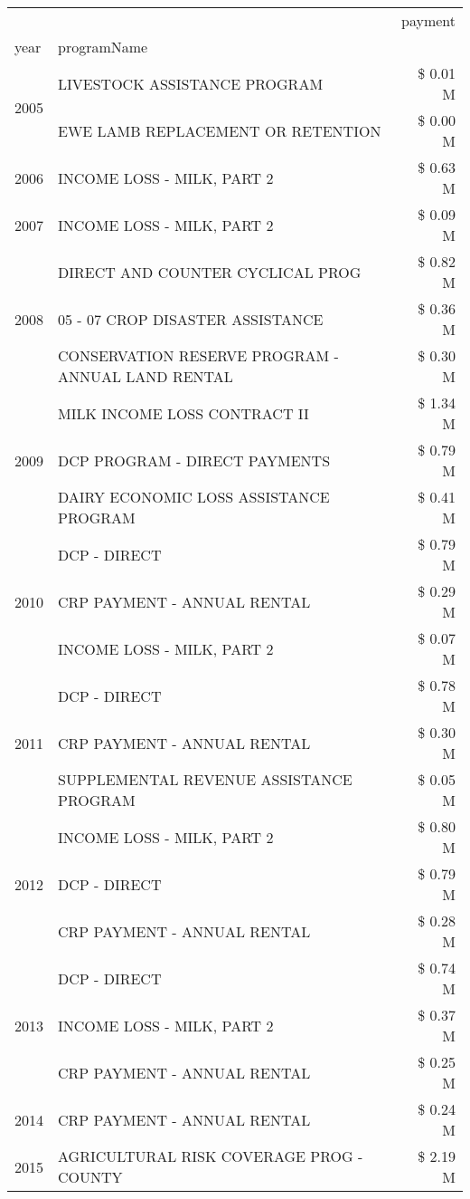\begin{tabular}{llr}
\toprule
 &  & payment \\
year & programName &  \\
\midrule
\multirow[t]{2}{*}{2005} & LIVESTOCK ASSISTANCE PROGRAM & \$ 0.01 M \\
 & EWE LAMB REPLACEMENT OR RETENTION & \$ 0.00 M \\
\cline{1-3}
2006 & INCOME LOSS - MILK, PART 2 & \$ 0.63 M \\
\cline{1-3}
2007 & INCOME LOSS - MILK, PART 2 & \$ 0.09 M \\
\cline{1-3}
\multirow[t]{3}{*}{2008} & DIRECT AND COUNTER CYCLICAL PROG & \$ 0.82 M \\
 & 05 - 07 CROP DISASTER ASSISTANCE & \$ 0.36 M \\
 & CONSERVATION RESERVE PROGRAM - ANNUAL LAND RENTAL & \$ 0.30 M \\
\cline{1-3}
\multirow[t]{3}{*}{2009} & MILK INCOME LOSS CONTRACT II & \$ 1.34 M \\
 & DCP PROGRAM - DIRECT PAYMENTS & \$ 0.79 M \\
 & DAIRY ECONOMIC LOSS ASSISTANCE PROGRAM & \$ 0.41 M \\
\cline{1-3}
\multirow[t]{3}{*}{2010} & DCP - DIRECT & \$ 0.79 M \\
 & CRP PAYMENT - ANNUAL RENTAL & \$ 0.29 M \\
 & INCOME LOSS - MILK, PART 2 & \$ 0.07 M \\
\cline{1-3}
\multirow[t]{3}{*}{2011} & DCP - DIRECT & \$ 0.78 M \\
 & CRP PAYMENT - ANNUAL RENTAL & \$ 0.30 M \\
 & SUPPLEMENTAL REVENUE ASSISTANCE PROGRAM & \$ 0.05 M \\
\cline{1-3}
\multirow[t]{3}{*}{2012} & INCOME LOSS - MILK, PART 2 & \$ 0.80 M \\
 & DCP - DIRECT & \$ 0.79 M \\
 & CRP PAYMENT - ANNUAL RENTAL & \$ 0.28 M \\
\cline{1-3}
\multirow[t]{3}{*}{2013} & DCP - DIRECT & \$ 0.74 M \\
 & INCOME LOSS - MILK, PART 2 & \$ 0.37 M \\
 & CRP PAYMENT - ANNUAL RENTAL & \$ 0.25 M \\
\cline{1-3}
2014 & CRP PAYMENT - ANNUAL RENTAL & \$ 0.24 M \\
\cline{1-3}
\multirow[t]{3}{*}{2015} & AGRICULTURAL RISK COVERAGE PROG - COUNTY & \$ 2.19 M \\

\end{tabular}
